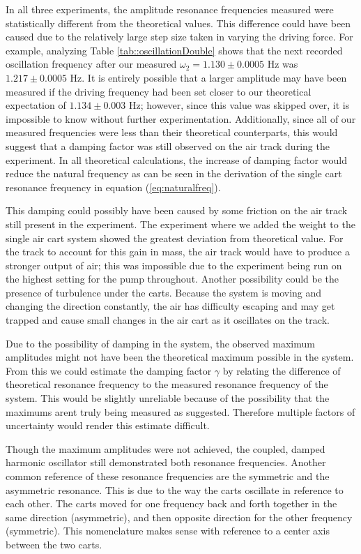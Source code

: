 \par In all three experiments, the amplitude resonance frequencies measured were statistically different from the theoretical values. This difference could have been caused due to the relatively large step size taken in varying the driving force. For example, analyzing Table \ref{tab::oscillationDouble} shows that the next recorded oscillation frequency after our measured $\omega_2 = 1.130 \pm 0.0005$ Hz was $1.217 \pm 0.0005$ Hz. It is entirely possible that a larger amplitude may have been measured if the driving frequency had been set closer to our theoretical expectation of $1.134 \pm 0.003$ Hz; however, since this value was skipped over, it is impossible to know without further experimentation. Additionally, since all of our measured frequencies were less than their theoretical counterparts, this would suggest that a damping factor was still observed on the air track during the experiment. In all theoretical calculations, the increase of damping factor would reduce the natural frequency as can be seen in the derivation of the single cart resonance frequency in equation (\ref{eq:naturalfreq}).

\par This damping could possibly have been caused by some friction on the air track still present in the experiment. The experiment where we added the weight to the single air cart system showed the greatest deviation from theoretical value. For the track to account for this gain in mass, the air track would have to produce a stronger output of air; this was impossible due to the experiment being run on the highest setting for the pump throughout. Another possibility could be the presence of turbulence under the carts. Because the system is moving and changing the direction constantly, the air has difficulty escaping and may get trapped and cause small changes in the air cart as it oscillates on the track. 

\par Due to the possibility of damping in the system, the observed maximum amplitudes might not have been the theoretical maximum possible in the system. From this we could estimate the damping factor $\gamma$ by relating the difference of theoretical resonance frequency to the measured resonance frequency of the system. This would be slightly unreliable because of the possibility that the maximums arent truly being measured as suggested. Therefore multiple factors of uncertainty would render this estimate difficult.

\par Though the maximum amplitudes were not achieved, the coupled, damped harmonic oscillator still demonstrated both resonance frequencies. Another common reference of these resonance frequencies are the symmetric and the asymmetric resonance. This is due to the way the carts oscillate in reference to each other. The carts moved for one frequency back and forth together in the same direction (asymmetric), and then opposite direction for the other frequency (symmetric). This nomenclature makes sense with reference to a center axis between the two carts.